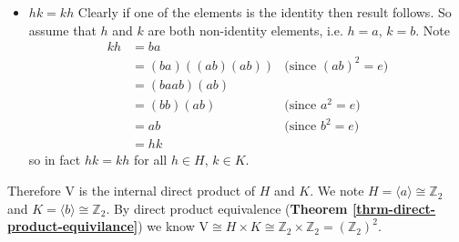 \begin{enumerate}
\begin{itemize}
        \item $\boxed{hk = kh}$ Clearly if one of the elements is the identity then result follows. So assume that $h$ and $k$ are both non-identity elements, i.e. $h = a$, $k = b$. Note
        \begin{align*}
            kh &= ba\\
            &= (ba)\left((ab)(ab)\right) & \text{(since }(ab)^2 = e)\\
            &= (baab)(ab)\\
            &= (bb)(ab) & \text{(since }a^2 = e)\\
            &= ab & \text{(since }b^2 = e)\\
            &= hk
        \end{align*}
        so in fact $hk = kh$ for all $h \in H$, $k \in K$.
    \end{itemize}
    Therefore $\mathrm{V}$ is the internal direct product of $H$ and $K$. We note $H = \langle a\rangle \cong \mathbb{Z}_2$ and $K = \langle b \rangle \cong \mathbb{Z}_2$. By direct product equivalence (\textbf{Theorem \ref{thrm-direct-product-equivilance}}) we know $\mathrm{V} \cong H \times K \cong \mathbb{Z}_2 \times \mathbb{Z}_2 = (\mathbb{Z}_2)^2$.
\end{enumerate}

